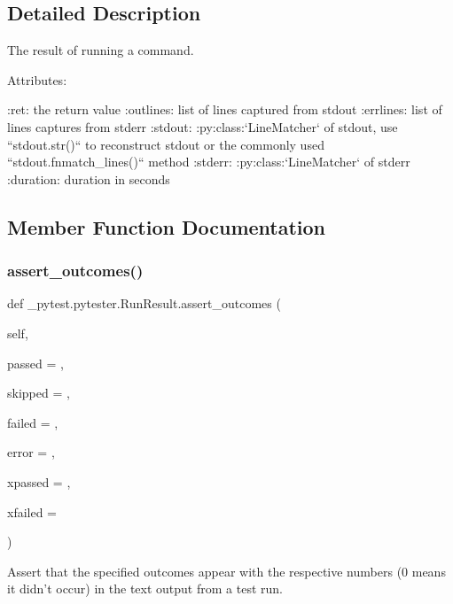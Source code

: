 \subsection{Detailed Description}
\begin{DoxyVerb}The result of running a command.

Attributes:

:ret: the return value
:outlines: list of lines captured from stdout
:errlines: list of lines captures from stderr
:stdout: :py:class:`LineMatcher` of stdout, use ``stdout.str()`` to
   reconstruct stdout or the commonly used ``stdout.fnmatch_lines()``
   method
:stderr: :py:class:`LineMatcher` of stderr
:duration: duration in seconds\end{DoxyVerb}
 

\subsection{Member Function Documentation}
\mbox{\label{class__pytest_1_1pytester_1_1_run_result_a035e9bed30ba93d546d0bf751313d192}} 
\subsubsection{\texorpdfstring{assert\+\_\+outcomes()}{assert\_outcomes()}}
{\footnotesize\ttfamily def \+\_\+pytest.\+pytester.\+Run\+Result.\+assert\+\_\+outcomes (\begin{DoxyParamCaption}\item[{}]{self,  }\item[{}]{passed = {},  }\item[{}]{skipped = {},  }\item[{}]{failed = {},  }\item[{}]{error = {},  }\item[{}]{xpassed = {},  }\item[{}]{xfailed = {} }\end{DoxyParamCaption})}

\begin{DoxyVerb}Assert that the specified outcomes appear with the respective
numbers (0 means it didn't occur) in the text output from a test run.\end{DoxyVerb}
 \mbox{\label{class__pytest_1_1pytester_1_1_run_result_a6b3db0f724dc02c8bbc7a4632dcdbf06}} 

